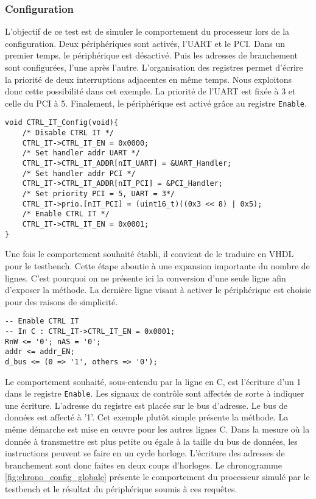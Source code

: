 \subsubsection{Configuration}
L'objectif de ce test est de simuler le comportement du processeur lors de la configuration.
Deux périphériques sont activés, l'UART et le PCI.
Dans un premier temps, le périphérique est désactivé.
Puis les adresses de branchement sont configurées, l'une après l'autre.
L'organisation des registres permet d'écrire la priorité de deux interruptions adjacentes en même temps.
Nous exploitons donc cette possibilité dans cet exemple.
La priorité de l'UART est fixée à 3 et celle du PCI à 5.
Finalement, le périphérique est activé grâce au registre \texttt{Enable}.
\begin{lstlisting}[style=CStyle]
void CTRL_IT_Config(void){
    /* Disable CTRL IT */
    CTRL_IT->CTRL_IT_EN = 0x0000;
    /* Set handler addr UART */
    CTRL_IT->CTRL_IT_ADDR[nIT_UART] = &UART_Handler;
    /* Set handler addr PCI */
    CTRL_IT->CTRL_IT_ADDR[nIT_PCI] = &PCI_Handler;
    /* Set priority PCI = 5, UART = 3*/
    CTRL_IT->prio.[nIT_PCI] = (uint16_t)((0x3 << 8) | 0x5);
    /* Enable CTRL IT */
    CTRL_IT->CTRL_IT_EN = 0x0001;
}
\end{lstlisting}
Une fois le comportement souhaité établi, il convient de le traduire en VHDL pour le testbench.
Cette étape aboutie à une expansion importante du nombre de lignes.
C'est pourquoi on ne présente ici la conversion d'une seule ligne afin d'exposer la méthode.
La dernière ligne visant à activer le périphérique est choisie pour des raisons de simplicité.
\begin{lstlisting}[style=vhdl]
-- Enable CTRL IT
-- In C : CTRL_IT->CTRL_IT_EN = 0x0001;
RnW <= '0'; nAS = '0';
addr <= addr_EN;
d_bus <= (0 => '1', others => '0');
\end{lstlisting}
Le comportement souhaité, sous-entendu par la ligne en C, est l'écriture d'un 1 dans le registre \texttt{Enable}.
Les signaux de contrôle sont affectés de sorte à indiquer une écriture.
L'adresse du registre est placée sur le bus d'adresse.
Le bus de données est affecté à '1'.
Cet exemple plutôt simple présente la méthode.
La même démarche est mise en œuvre pour les autres lignes C.
Dans la mesure où la donnée à transmettre est plus petite ou égale à la taille du bus de données, les instructions peuvent se faire en un cycle horloge.
L'écriture des adresses de branchement sont donc faites en deux coups d'horloges.
Le chronogramme \ref{fig:chrono_config_globale} présente le comportement du processeur simulé par le testbench et le résultat du périphérique soumis à ces requêtes.
